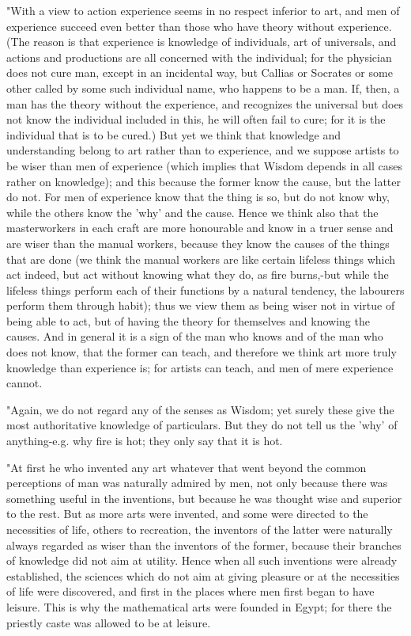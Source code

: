 "With a view to action experience seems in no respect inferior to
art, and men of experience succeed even better than those who have
theory without experience. (The reason is that experience is knowledge
of individuals, art of universals, and actions and productions are
all concerned with the individual; for the physician does not cure
man, except in an incidental way, but Callias or Socrates or some
other called by some such individual name, who happens to be a man.
If, then, a man has the theory without the experience, and recognizes
the universal but does not know the individual included in this, he
will often fail to cure; for it is the individual that is to be cured.)
But yet we think that knowledge and understanding belong to art rather
than to experience, and we suppose artists to be wiser than men of
experience (which implies that Wisdom depends in all cases rather
on knowledge); and this because the former know the cause, but the
latter do not. For men of experience know that the thing is so, but
do not know why, while the others know the 'why' and the cause. Hence
we think also that the masterworkers in each craft are more honourable
and know in a truer sense and are wiser than the manual workers, because
they know the causes of the things that are done (we think the manual
workers are like certain lifeless things which act indeed, but act
without knowing what they do, as fire burns,-but while the lifeless
things perform each of their functions by a natural tendency, the
labourers perform them through habit); thus we view them as being
wiser not in virtue of being able to act, but of having the theory
for themselves and knowing the causes. And in general it is a sign
of the man who knows and of the man who does not know, that the former
can teach, and therefore we think art more truly knowledge than experience
is; for artists can teach, and men of mere experience cannot.

"Again, we do not regard any of the senses as Wisdom; yet surely these
give the most authoritative knowledge of particulars. But they do
not tell us the 'why' of anything-e.g. why fire is hot; they only
say that it is hot. 

"At first he who invented any art whatever that went beyond the common
perceptions of man was naturally admired by men, not only because
there was something useful in the inventions, but because he was thought
wise and superior to the rest. But as more arts were invented, and
some were directed to the necessities of life, others to recreation,
the inventors of the latter were naturally always regarded as wiser
than the inventors of the former, because their branches of knowledge
did not aim at utility. Hence when all such inventions were already
established, the sciences which do not aim at giving pleasure or at
the necessities of life were discovered, and first in the places where
men first began to have leisure. This is why the mathematical arts
were founded in Egypt; for there the priestly caste was allowed to
be at leisure. 

